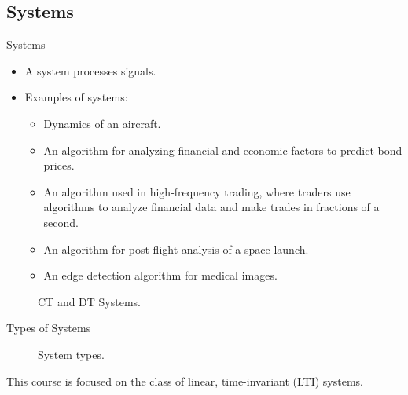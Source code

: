\subsection{Systems}

\begin{frame}{Systems}
    \begin{itemize}[<+->]
        \item A system processes signals.
        \item Examples of systems:
            \begin{itemize}
                \item Dynamics of an aircraft.
                \item An algorithm for analyzing financial and economic factors to predict bond prices.
                \item An algorithm used in high-frequency trading, where traders use algorithms to analyze financial data and make trades in fractions of a second.
                \item An algorithm for post-flight analysis of a space launch.
                \item An edge detection algorithm for medical images.
            \end{itemize}
    \end{itemize}
    \pause
    \begin{figure}
        \centering
            
            
        \caption{CT and DT Systems.}\label{fi:ct_dt_systems}
    \end{figure}
\end{frame}


\begin{frame}[plain]{Types of Systems}
    \begin{figure}
        \centering
        
        \caption{System types.}\label{fi:system_types}
    \end{figure}
    This course is focused on the class of linear, time-invariant (LTI) systems.
\end{frame}



